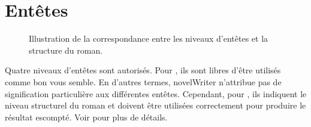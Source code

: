 \documentclass[a4paper,11pt,french]{sphinxmanual}
\begin{document}
\section{En\sphinxhyphen{}têtes}
\label{\detokenize{usage_format:headings}}\label{\detokenize{usage_format:a-fmt-head}}
\begin{figure}[htbp]
\centering
\capstart

\noindent{}
\caption{Illustration de la correspondance entre les niveaux d’en\sphinxhyphen{}têtes et la structure du roman.}\label{\detokenize{usage_format:id2}}\end{figure}

\sphinxAtStartPar
Quatre niveaux d’en\sphinxhyphen{}têtes sont autorisés. Pour {\hyperref[\detokenize{int_glossary:term-Project-Notes}]{}}, ils sont libres d’être utilisés comme bon vous semble. En d’autres termes, novelWriter n’attribue pas de signification particulière aux différentes en\sphinxhyphen{}têtes. Cependant, pour {\hyperref[\detokenize{int_glossary:term-Novel-Documents}]{}}, ils indiquent le niveau structurel du roman et doivent être utilisées correctement pour produire le résultat escompté. Voir {\hyperref[\detokenize{project_structure:a-struct-heads}]{}} pour plus de détails.
\end{document}
